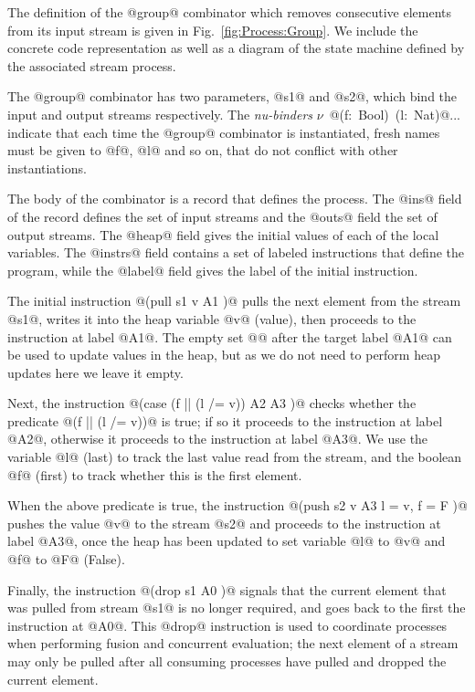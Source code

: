 The definition of the @group@ combinator which removes consecutive elements from its input stream is given in Fig.~\ref{fig:Process:Group}. We include the concrete code representation as well as a diagram of the state machine defined by the associated stream process.

The @group@ combinator has two parameters, @s1@ and @s2@, which bind the input and output streams respectively. The \emph{nu-binders} \mbox{$\nu$ @(f: Bool) (l: Nat)@...} indicate that each time the @group@ combinator is instantiated, fresh names must be given to @f@, @l@ and so on, that do not conflict with other instantiations. 

The body of the combinator is a record that defines the process. The @ins@ field of the record defines the set of input streams and the @outs@ field the set of output streams. The @heap@ field gives the initial values of each of the local variables. The @instrs@ field contains a set of labeled instructions that define the program, while the @label@ field gives the label of the initial instruction. 

The initial instruction @(pull s1 v A1 {})@ pulls the next element from the stream @s1@, writes it into the heap variable @v@ (value), then proceeds to the instruction at label @A1@.
The empty set @{}@ after the target label @A1@ can be used to update values in the heap, but as we do not need to perform heap updates here we leave it empty. 

Next, the instruction @(case (f || (l /= v)) A2 {} A3 {})@ checks whether the predicate @(f || (l /= v))@ is true; if so it proceeds to the instruction at label @A2@, otherwise it proceeds to the instruction at label @A3@.
We use the variable @l@ (last) to track the last value read from the stream, and the boolean @f@ (first) to track whether this is the first element.

When the above predicate is true, the instruction @(push s2 v A3 { l = v, f = F })@ pushes the value @v@ to the stream @s2@ and proceeds to the instruction at label @A3@, once the heap has been updated to set variable @l@ to @v@ and @f@ to @F@ (False). 

Finally, the instruction @(drop s1 A0 {})@ signals that the current element that was pulled from stream @s1@ is no longer required, and goes back to the first the instruction at @A0@.
This @drop@ instruction is used to coordinate processes when performing fusion and concurrent evaluation; the next element of a stream may only be pulled after all consuming processes have pulled and dropped the current element.

